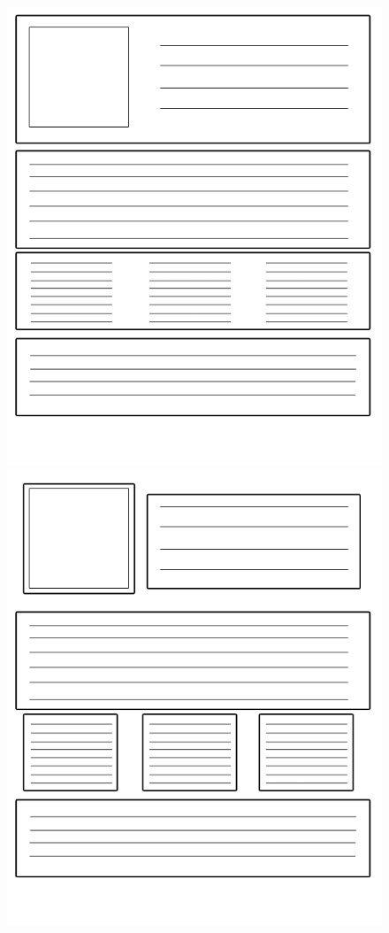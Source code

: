 \documentclass{beamer}
\begin{document}
\begin{frame}[fragile]
\begin{figure}[!tbp]
\begin{minipage}[b]{0.3\textwidth}
    \includegraphics[width=\textwidth]{images/page_complicated2.png}
  \end{minipage}
  \hfill
  \begin{minipage}[b]{0.3\textwidth}
    \includegraphics[width=\textwidth]{images/page_complicated3.png}

\end{minipage}
\end{figure}
\end{frame}
\end{document}
